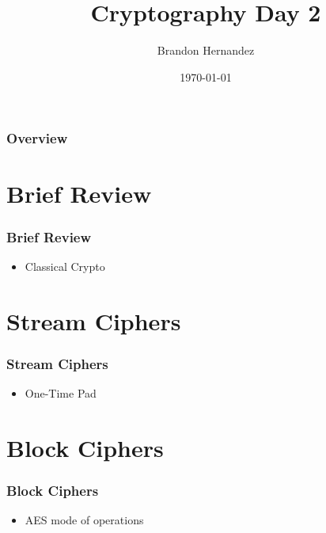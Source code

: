 \documentclass{beamer}
\title[Cryptography Day 2]{\huge \textbf{Cryptography Day 2}} %
\author{Brandon Hernandez} %
\date{\today} %
\begin{document}
\begin{frame}
    \titlepage %
\end{frame}


\begin{frame}
    \frametitle{Overview} %
    \tableofcontents %
\end{frame}

\section{Brief Review}
\begin{frame}
    \frametitle{Brief Review}
    \begin{itemize}
        \item Classical Crypto

    \end{itemize}
\end{frame}

\section{Stream Ciphers}
\begin{frame}
    \frametitle{Stream Ciphers}
    \begin{itemize}
    	\item One-Time Pad
    \end{itemize}
\end{frame}

\section{Block Ciphers}
\begin{frame}
    \frametitle{Block Ciphers}
    \begin{itemize}
    	\item AES mode of operations
    \end{itemize}
\end{frame}
\end{document}
